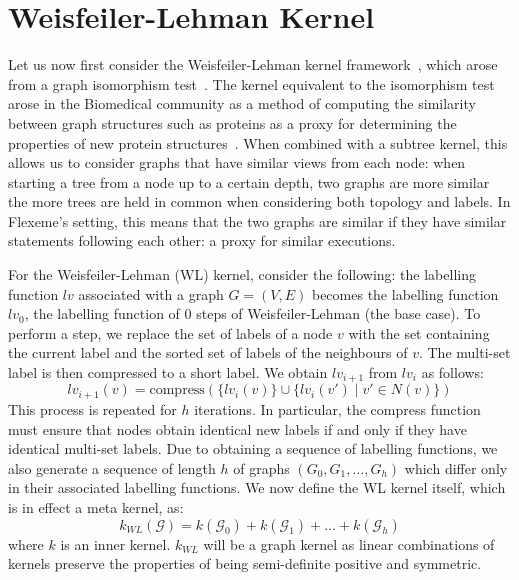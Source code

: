 \section{Weisfeiler-Lehman Kernel}
\label{appendix:graph_kernels:wl}

Let us now first consider the Weisfeiler-Lehman kernel
framework~\cite{shervashidze2011weisfeiler}, which arose from a graph
isomorphism test~\cite{Weisfeiler1968ReductionOA}. The kernel equivalent to the
isomorphism test arose in the Biomedical community as a method of computing the
similarity between graph structures such as proteins as a proxy for determining
the properties of new protein structures~\cite{Sugiyama2018Bioinfo}. When
combined with a subtree kernel, this allows us to consider graphs that have
similar views from each node: when starting a tree from a node up to a certain
depth, two graphs are more similar the more trees are held in common when
considering both topology and labels. In Flexeme's setting, this means that the
two graphs are similar if they have similar statements following each other: a
proxy for similar executions.

For the Weisfeiler-Lehman (WL) kernel, consider the following: the labelling
function $lv$ associated with a graph $G=(V,E)$ becomes the labelling function
$lv_0$, the labelling function of 0 steps of Weisfeiler-Lehman (the base case).
To perform a step, we replace the set of labels of a node $v$ with the set
containing the current label and the sorted set of labels of the neighbours of
$v$. The multi-set label is then compressed to a short label. We obtain
$lv_{i+1}$ from $lv_i$ as follows: 
\begin{equation}
    lv_{i+1}(v) = \text{compress}(\{lv_i(v)\} \cup \{lv_i(v') \mid v' \in N(v)\})
\end{equation}
%
This process is repeated for $h$ iterations. In particular, the compress
function must ensure that nodes obtain identical new labels if and only if they
have identical multi-set labels. Due to obtaining a sequence of labelling
functions, we also generate a sequence of length $h$ of graphs $(G_0, G_1,
\ldots, G_h)$ which differ only in their associated labelling functions. We now
define the WL kernel itself, which is in effect a meta kernel, as:
\begin{equation}
    k_{WL}(\mathcal{G}) = k(\mathcal{G}_0) + k(\mathcal{G}_1) + \ldots + k(\mathcal{G}_h) 
\end{equation}
%
where $k$ is an inner kernel. $k_{WL}$ will be a graph kernel as linear
combinations of kernels preserve the properties of being semi-definite positive
and symmetric.

